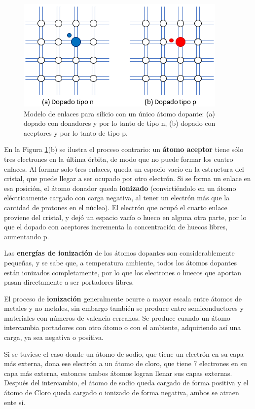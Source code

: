 \begin{figure}[H]
    \centering
    \includegraphics{figuras/modelo_enlaces_dopado.png}
    \caption{Modelo de enlaces para silicio con un único átomo dopante: (a) dopado con donadores y por lo tanto de tipo n, (b) dopado con aceptores y por lo tanto de tipo p.}
    \label{dopado_modelo_enlaces}
\end{figure}

\newpage
En la Figura \ref{dopado_modelo_enlaces}(b) se ilustra el proceso contrario: un \textbf{átomo aceptor} tiene sólo tres electrones en la última órbita, de modo que no puede formar los cuatro enlaces. Al formar solo tres enlaces, queda un espacio vacío en la estructura del cristal, que puede llegar a ser ocupado por otro electrón. Si se forma un enlace en esa posición, el átomo donador queda \textbf{ionizado} (convirtiéndolo en un átomo eléctricamente cargado con carga negativa, al tener un electrón más que la cantidad de protones en el núcleo). El electrón que ocupó el cuarto enlace proviene del cristal, y dejó un espacio vacío o hueco en alguna otra parte, por lo que el dopado con aceptores incrementa la concentración de huecos libres, aumentando p.

Las \textbf{energías de ionización} de los átomos dopantes son considerablemente pequeñas, y se sabe que, a temperatura ambiente, todos los átomos dopantes están ionizados completamente, por lo que los electrones o huecos que aportan pasan directamente a ser portadores libres.

\vspace{5mm}
\begin{tcolorbox}[sharp corners, colback=white, colframe=tec-blue, title=Ionización de átomos en cloruro de sodio]
\small El proceso de \textbf{ionización} generalmente ocurre a mayor escala entre átomos de metales y no metales, sin embargo también se produce entre semiconductores y materiales con números de valencia cercanos. Se produce cuando un átomo intercambia portadores con otro átomo o con el ambiente, adquiriendo así una carga, ya sea negativa o positiva.

Si se tuviese el caso donde un átomo de sodio, que tiene un electrón en su capa más externa, dona ese electrón a un átomo de cloro, que tiene 7 electrones en su capa más externa, entonces ambos átomos logran llenar sus capas externas. Después del intercambio, el átomo de sodio queda cargado de forma positiva y el átomo de Cloro queda cargado o ionizado de forma negativa, ambos se atraen ente sí.
\end{tcolorbox}



